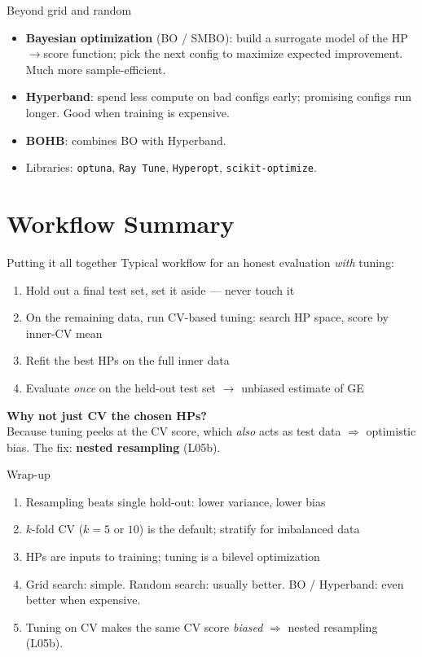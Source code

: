 \documentclass[aspectratio=169]{beamer}
\begin{document}
\begin{frame}{Beyond grid and random}
  \begin{itemize}
    \item \textbf{Bayesian optimization} (BO / SMBO): build a surrogate model of the HP$\to$score function; pick the next config to maximize expected improvement. Much more sample-efficient.
    \item \textbf{Hyperband}: spend less compute on bad configs early; promising configs run longer. Good when training is expensive.
    \item \textbf{BOHB}: combines BO with Hyperband.
    \item Libraries: \texttt{optuna}, \texttt{Ray Tune}, \texttt{Hyperopt}, \texttt{scikit-optimize}.
  \end{itemize}
\end{frame}

\section{Workflow Summary}

\begin{frame}{Putting it all together}
  Typical workflow for an honest evaluation \emph{with} tuning:
  \begin{enumerate}
    \item Hold out a final test set, set it aside — never touch it
    \item On the remaining data, run CV-based tuning: search HP space, score by inner-CV mean
    \item Refit the best HPs on the full inner data
    \item Evaluate \emph{once} on the held-out test set $\to$ unbiased estimate of GE
  \end{enumerate}
  \vfill
  \textbf{Why not just CV the chosen HPs?}\\
  Because tuning peeks at the CV score, which \emph{also} acts as test data $\Rightarrow$ optimistic bias. The fix: \textbf{nested resampling} (L05b).
\end{frame}

\begin{frame}{Wrap-up}
  \begin{enumerate}
    \item Resampling beats single hold-out: lower variance, lower bias
    \item $k$-fold CV ($k = 5$ or $10$) is the default; stratify for imbalanced data
    \item HPs are inputs to training; tuning is a bilevel optimization
    \item Grid search: simple. Random search: usually better. BO / Hyperband: even better when expensive.
    \item Tuning on CV makes the same CV score \emph{biased} $\Rightarrow$ nested resampling (L05b).
  \end{enumerate}
\end{frame}
\end{document}

